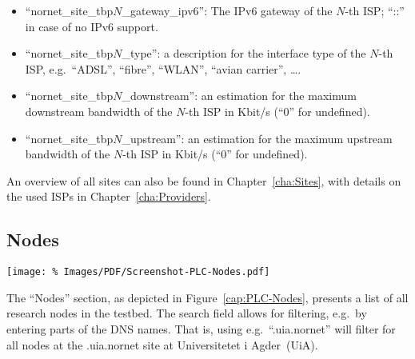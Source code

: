 \begin{itemize}
 \item ``nornet\_site\_tbp$N$\_gateway\_ipv6'': The IPv6 gateway of the $N$-th ISP; ``::'' in case of no IPv6 support.
 
 \item ``nornet\_site\_tbp$N$\_type'': a description for the interface type of the $N$-th ISP, e.g.\ ``ADSL'', ``fibre'', ``WLAN'', ``avian carrier'', \ldots.

 \item ``nornet\_site\_tbp$N$\_downstream'': an estimation for the maximum downstream bandwidth of the $N$-th ISP in Kbit/s (``0'' for undefined).
 
 \item ``nornet\_site\_tbp$N$\_upstream'': an estimation for the maximum upstream bandwidth of the $N$-th ISP in Kbit/s (``0'' for undefined).

\end{itemize}
 
An overview of all  sites can also be found in Chapter~\ref{cha:Sites}, with details on the used ISPs in Chapter~\ref{cha:Providers}.


\subsection{Nodes}
\label{sub:Nodes}

\begin{figure*}
\begin{center}
\texttt{[image: \%
   Images/PDF/Screenshot-PLC-Nodes.pdf]}
\end{center}
\caption{Nodes}
\label{cap:PLC-Nodes}
\end{figure*}

The ``Nodes'' section, as depicted in Figure~\ref{cap:PLC-Nodes}, presents a list of all research nodes in the testbed. The search field allows for filtering, e.g.\ by entering parts of the DNS names. That is, using e.g.\ ``.uia.nornet'' will filter for all nodes at the .uia.nornet site at \foreignlanguage{norsk}{Universitetet i Agder~(UiA)}.

